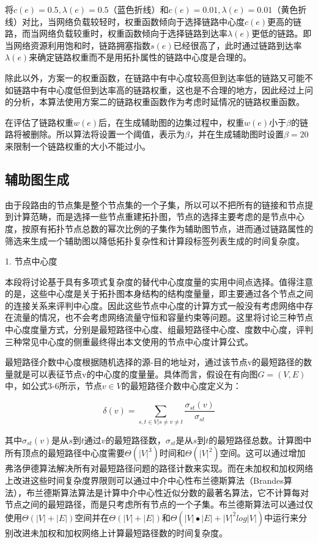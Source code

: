 将$c(e)=0.5,\lambda(e)=0.5$（蓝色折线）和$c\left(e\right)=0.01,\lambda\left(e\right)=0.01$（黄色折线）对比，当网络负载较轻时，权重函数倾向于选择链路中心度$c\left(e\right)$更高的链路，而当网络负载较重时，权重函数倾向于选择链路到达率$\lambda\left(e\right)$更低的链路。即当网络资源利用饱和时，链路拥塞指数$s\left(e\right)$已经很高了，此时通过链路到达率$\lambda\left(e\right)$来确定链路权重而不是用拓扑属性的链路中心度是合理的。

除此以外，方案一的权重函数，在链路中有中心度较高但到达率低的链路又可能不如链路中有中心度低但到达率高的链路权重，这也是不合理的地方，因此经过上问的分析，本算法使用方案二的链路权重函数作为考虑时延情况的链路权重函数。

在评估了链路权重$w\left(e\right)$后，在生成辅助图的边集过程中，权重$w\left(e\right)$小于$\beta$的链路将被删除。所以算法将设置一个阈值，表示为$\beta$，并在生成辅助图时设置$\beta=20$来限制一个链路权重的大小不能过小。

\subsection{辅助图生成}

由于段路由的节点集是整个节点集的一个子集，所以可以不把所有的链接和节点提到计算范畴，而是选择一些节点重建拓扑图，节点的选择主要考虑的是节点中心度，按原有拓扑节点总数的幂次比例的子集作为辅助图节点，进而通过链路属性的筛选来生成一个辅助图以降低拓扑复杂性和计算段标签列表生成的时间复杂度。

1. 节点中心度

本段将讨论基于具有多项式复杂度的替代中心度度量的实用中间点选择。值得注意的是，这些中心度是关于拓扑图本身结构的结构度量量，即主要通过各个节点之间的连接关系来评判中心度。因此这些节点中心度的计算方式一般没有考虑网络中存在流量的情况，也不会考虑网络流量守恒和容量约束等问题。这里将讨论三种节点中心度度量方式，分别是最短路径中心度、组最短路径中心度、度数中心度，评判三种常见中心度的侧重最终得出本文使用的节点中心度计算公式。

最短路径介数中心度根据随机选择的源-目的地址对，通过该节点v的最短路径的数量就是可以表征节点v的中心度的度量量。具体而言，假设在有向图$G=\left(V,E\right)$中，如公式3-6所示，节点$v \in V$的最短路径介数中心度定义为：

\begin{equation} \label{shortest path median centre degree}
    \delta\left(v\right)=\sum_{s,t\in V|s\neq v\neq t}\frac{\sigma_{st}\left(v\right)}{\sigma_{st}}
\end{equation}

其中$\sigma_{st}\left(v\right)$是从$s$到$t$通过$v$的最短路径数，$\sigma_{st}$是从$s$到$t$的最短路径总数。计算图中所有顶点的最短路径中心度需要$\Theta({|V|}^3)$时间和$\Theta({|V|}^2)$空间。这可以通过增加弗洛伊德算法解决所有对最短路径问题的路径计数来实现。而在未加权和加权网络上改进这些时间复杂度界限则可以通过中介中心性布兰德斯算法（Brandes算法），布兰德斯算法算法是计算中介中心性近似分数的最著名算法，它不计算每对节点之间的最短路径，而是只考虑所有节点的一个子集。布兰德斯算法可以通过仅使用$\Theta(|V|+|E|)$空间并在$\Theta(|V|+|E|)$和$\Theta(|V|\bullet|E|+{|V|}^2log|V|)$中运行来分别改进未加权和加权网络上计算最短路径数的时间复杂度。

